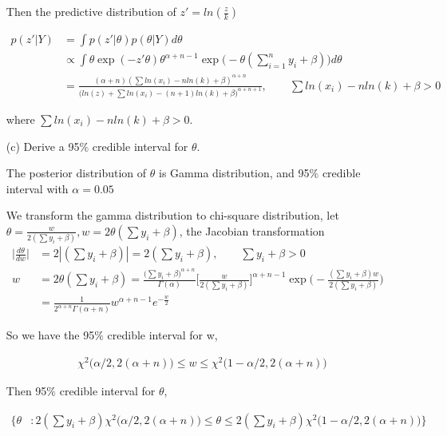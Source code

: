 \begin{itemize}
Then the predictive distribution of $z' = ln (\frac{z}{k})$

\begin{align*}
   p(z' | Y) &= \int p(z' | \theta) p(\theta| Y) d\theta \\
   & \propto  \int \theta \exp(-z' \theta) \theta^{\alpha + n -1} \exp \Big( - \theta (\sum_{i=1}^n y_i+ \beta)\Big) d\theta\\
   &= \frac{(\alpha + n) (\sum ln(x_i) -n ln (k) + \beta)^{\alpha + n}}{\Big(ln(z) + \sum ln(x_i) - (n+1) ln (k) + \beta \Big)^{\alpha + n + 1}}, \qquad \sum ln(x_i) -n ln (k) + \beta > 0
\end{align*}

where $\sum ln(x_i) -n ln (k) + \beta > 0$.

\item[(c)] Derive a 95$\%$ credible interval for $\theta$.

The posterior distribution of $\theta$ is Gamma distribution, and 95$\%$ credible interval with $\alpha = 0.05$

We transform the gamma distribution to chi-square distribution, let $\theta = \frac{w}{2 (\sum y_i + \beta) } , w= 2\theta (\sum y_i + \beta)$, 
the Jacobian transformation 
\begin{align*}
   \Big | \frac{d \theta}{ d w} \Big| &= 2 |(\sum y_i + \beta) | = 2 (\sum y_i + \beta), \qquad \sum y_i + \beta > 0 \\
   w &= 2\theta (\sum y_i + \beta)= \frac{\Big( \sum y_i + \beta \Big)^{\alpha + n}}{\Gamma(\alpha)} \Big[ \frac{w}{2 (\sum y_i + \beta)} \Big]^{\alpha + n -1} \exp \Big(- \frac{(\sum y_i + \beta) w}{2(\sum y_i + \beta)} \Big)\\
   &= \frac{1}{2^{\alpha + n} \Gamma(\alpha + n)} w^{\alpha + n -1} e^{-\frac{w}{2}}
\end{align*}

So we have the 95$\%$ credible interval for w,

\begin{align*}
    & \chi^2 \Big(\alpha/2, 2(\alpha + n) \Big) \leq w \leq  \chi^2 \Big(1-\alpha/2, 2(\alpha + n) \Big) 
\end{align*}

Then 95$\%$ credible interval for $\theta$,

\begin{align*}
  \Bigg \{ \theta &: 2 (\sum y_i + \beta) \chi^2 \Big(\alpha/2, 2(\alpha + n) \Big) \leq \theta \leq  2 (\sum y_i + \beta) \chi^2 \Big(1-\alpha/2, 2(\alpha + n) \Big) \Bigg \}
\end{align*}



\end{itemize}
